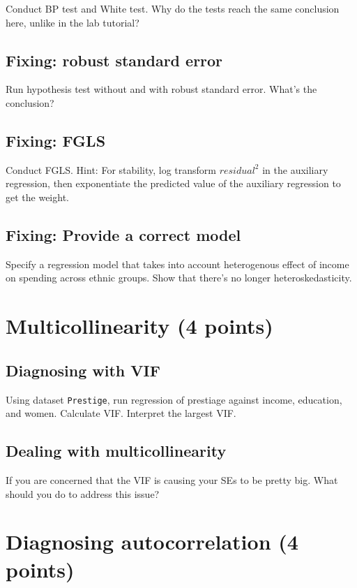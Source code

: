 \documentclass{article}\usepackage[]{graphicx}\usepackage[]{color}
\begin{document}
Conduct BP test and White test. Why do the tests reach the same conclusion here, unlike in the lab tutorial?

\subsection{Fixing: robust standard error}

Run hypothesis test without and with robust standard error. What's the conclusion?

\subsection{Fixing: FGLS}

Conduct FGLS. Hint: For stability, log transform $residual^2$ in the auxiliary regression, then exponentiate the predicted value of the auxiliary regression to get the weight.

\subsection{Fixing: Provide a correct model}

Specify a regression model that takes into account heterogenous effect of income on spending across ethnic groups. Show that there's no longer heteroskedasticity.

\section{Multicollinearity (4 points)}

\subsection{Diagnosing with VIF}

Using dataset \verb`Prestige`, run regression of prestiage against income, education, and women. Calculate VIF. Interpret the largest VIF.

\subsection{Dealing with multicollinearity}

If you are concerned that the VIF is causing your SEs to be pretty big. What should you do to address this issue?

\section{Diagnosing autocorrelation (4 points)}
\end{document}
